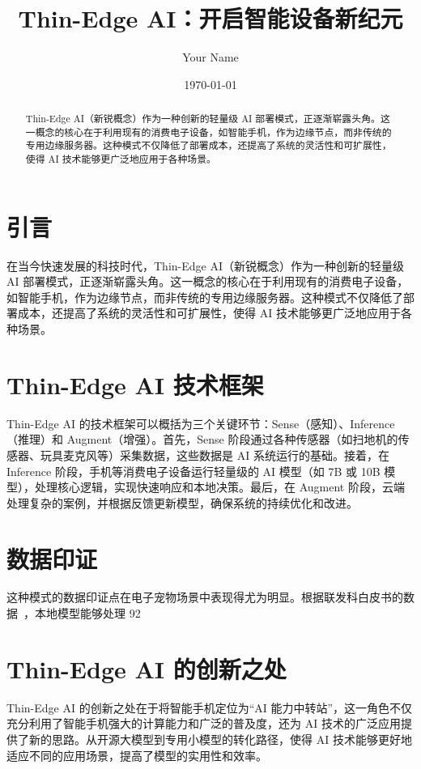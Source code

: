 \documentclass{article}
\title{Thin-Edge AI：开启智能设备新纪元}
\author{Your Name} %
\date{\today}
\begin{document}
\begin{CJK*}{UTF8}{gkai} %
\maketitle

\begin{abstract}
Thin-Edge AI（新锐概念）作为一种创新的轻量级 AI 部署模式，正逐渐崭露头角。这一概念的核心在于利用现有的消费电子设备，如智能手机，作为边缘节点，而非传统的专用边缘服务器。这种模式不仅降低了部署成本，还提高了系统的灵活性和可扩展性，使得 AI 技术能够更广泛地应用于各种场景。
\end{abstract}

\section{引言}
在当今快速发展的科技时代，Thin-Edge AI（新锐概念）作为一种创新的轻量级 AI 部署模式，正逐渐崭露头角。这一概念的核心在于利用现有的消费电子设备，如智能手机，作为边缘节点，而非传统的专用边缘服务器。这种模式不仅降低了部署成本，还提高了系统的灵活性和可扩展性，使得 AI 技术能够更广泛地应用于各种场景。

\section{Thin-Edge AI 技术框架}
Thin-Edge AI 的技术框架可以概括为三个关键环节：Sense（感知）、Inference（推理）和 Augment（增强）。首先，Sense 阶段通过各种传感器（如扫地机的传感器、玩具麦克风等）采集数据，这些数据是 AI 系统运行的基础。接着，在 Inference 阶段，手机等消费电子设备运行轻量级的 AI 模型（如 7B 或 10B 模型），处理核心逻辑，实现快速响应和本地决策。最后，在 Augment 阶段，云端处理复杂的案例，并根据反馈更新模型，确保系统的持续优化和改进。

\section{数据印证}
这种模式的数据印证点在电子宠物场景中表现得尤为明显。根据联发科白皮书的数据~\cite{mediatek_whitepaper}，本地模型能够处理 92%

\section{Thin-Edge AI 的创新之处}
Thin-Edge AI 的创新之处在于将智能手机定位为“AI 能力中转站”，这一角色不仅充分利用了智能手机强大的计算能力和广泛的普及度，还为 AI 技术的广泛应用提供了新的思路。从开源大模型到专用小模型的转化路径，使得 AI 技术能够更好地适应不同的应用场景，提高了模型的实用性和效率。


\end{CJK*}
\end{document}
